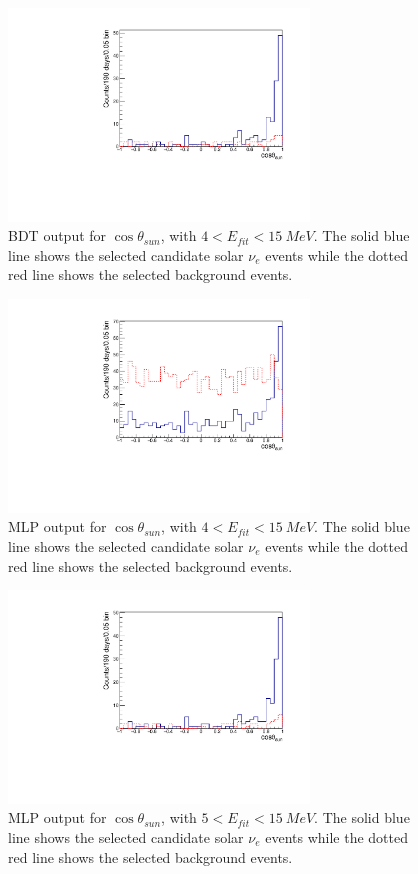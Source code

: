 \begin{figure}[!htb]
	\centering
	\includegraphics[width=8cm]{cosThetaToSun_5to15_BDT.pdf}
	\caption{BDT output for $\cos\theta_{sun}$, with $4<E_{fit}<15~MeV$. The solid blue line shows the selected candidate solar $\nu_e$ events while the dotted red line shows the selected background events.}
	\label{cosThetaToSun_5to15_BDT}
\end{figure}

\begin{figure}[!htb]
	\centering
	\includegraphics[width=8cm]{cosThetaToSun_4to15_MLP.pdf}
	\caption{MLP output for $\cos\theta_{sun}$, with $4<E_{fit}<15~MeV$. The solid blue line shows the selected candidate solar $\nu_e$ events while the dotted red line shows the selected background events.}
	\label{cosThetaToSun_4to15_MLP}
\end{figure}

\begin{figure}[!htb]
	\centering
	\includegraphics[width=8cm]{cosThetaToSun_5to15_MLP.pdf}
	\caption{MLP output for $\cos\theta_{sun}$, with $5<E_{fit}<15~MeV$. The solid blue line shows the selected candidate solar $\nu_e$ events while the dotted red line shows the selected background events.}
	\label{cosThetaToSun_5to15_MLP}
\end{figure}

